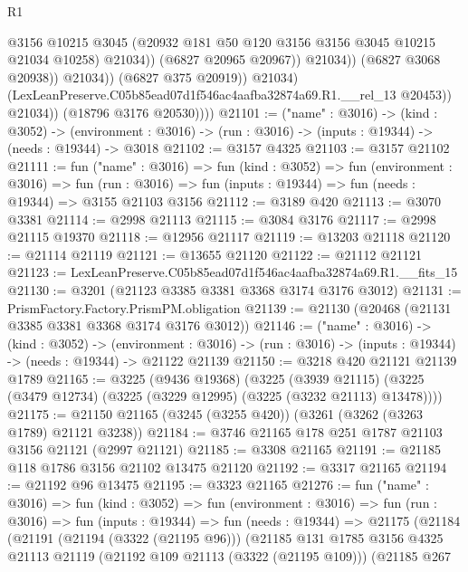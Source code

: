 \begin{lexlean}{R1}
\begin{coremodule}
                                    @3156
                                    @10215
                                    @3045
                                    (@20932 @181 @50 @120 @3156 @3156 @3045 @10215 @21034 @10258)
                                    @21034))
                                (@6827 @20965 @20967))
                              @21034))
                          (@6827 @3068 @20938))
                        @21034))
                    (@6827 @375 @20919))
                  @21034)
                (LexLeanPreserve.C05b85ead07d1f546ac4aafba32874a69.R1.__rel_13 @20453))
              @21034))
          (@18796 @3176 @20530))))
@21101 := ("name" : @3016) ->
  (kind : @3052) ->
  (environment : @3016) -> (run : @3016) -> (inputs : @19344) -> (needs : @19344) -> @3018
@21102 := @3157 @4325
@21103 := @3157 @21102
@21111 := fun ("name" : @3016) =>
  fun (kind : @3052) =>
  fun (environment : @3016) =>
  fun (run : @3016) => fun (inputs : @19344) => fun (needs : @19344) => @3155 @21103 @3156
@21112 := @3189 @420
@21113 := @3070 @3381
@21114 := @2998 @21113
@21115 := @3084 @3176
@21117 := @2998 @21115 @19370
@21118 := @12956 @21117
@21119 := @13203 @21118
@21120 := @21114 @21119
@21121 := @13655 @21120
@21122 := @21112 @21121
@21123 := LexLeanPreserve.C05b85ead07d1f546ac4aafba32874a69.R1.__fits_15
@21130 := @3201 (@21123 @3385 @3381 @3368 @3174 @3176 @3012)
@21131 := PrismFactory.Factory.PrismPM.obligation
@21139 := @21130 (@20468 (@21131 @3385 @3381 @3368 @3174 @3176 @3012))
@21146 := ("name" : @3016) ->
  (kind : @3052) ->
  (environment : @3016) -> (run : @3016) -> (inputs : @19344) -> (needs : @19344) -> @21122 @21139
@21150 := @3218 @420 @21121 @21139 @1789
@21165 := @3225
    (@9436 @19368)
    (@3225
      (@3939 @21115)
      (@3225 (@3479 @12734) (@3225 (@3229 @12995) (@3225 (@3232 @21113) @13478))))
@21175 := @21150 @21165 (@3245 (@3255 @420)) (@3261 (@3262 (@3263 @1789) @21121 @3238))
@21184 := @3746 @21165 @178 @251 @1787 @21103 @3156 @21121 (@2997 @21121)
@21185 := @3308 @21165
@21191 := @21185 @118 @1786 @3156 @21102 @13475 @21120
@21192 := @3317 @21165
@21194 := @21192 @96 @13475
@21195 := @3323 @21165
@21276 := fun ("name" : @3016) =>
  fun (kind : @3052) =>
  fun (environment : @3016) =>
  fun (run : @3016) =>
  fun (inputs : @19344) =>
  fun (needs : @19344) =>
  @21175
    (@21184
      (@21191
        (@21194 (@3322 (@21195 @96)))
        (@21185
          @131
          @1785
          @3156
          @4325
          @21113
          @21119
          (@21192 @109 @21113 (@3322 (@21195 @109)))
          (@21185
            @267

\end{coremodule}
\end{lexlean}
